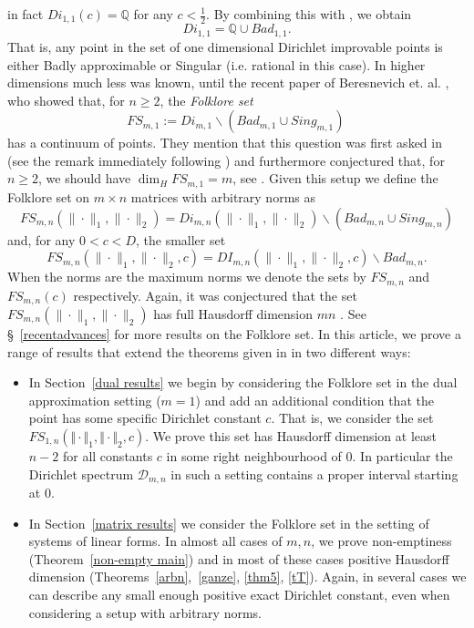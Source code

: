 \documentclass[10pt]{amsart}
\theoremstyle{definition}
\newcommand{\Q}{\mathbb{Q}}
\begin{document}
in fact $Di_{1,1}(c)=\Q$ for any $c<\frac{1}{2}$.
By combining this with \cite[Theorem 1]{DavenportSchmidt3},  we obtain
\begin{equation*}
    Di_{1,1}=\Q\cup Bad_{1,1}.
\end{equation*}
That is, any point in the set of one dimensional Dirichlet improvable points is either Badly approximable or Singular (i.e. rational in this case). In higher dimensions much less was known, until the recent paper of Beresnevich et. al. \cite{BerGuaMarRamVel}, who showed that, for $n\geq 2$, the \textit{Folklore set}
\begin{equation*}
    FS_{m,1}:=Di_{m,1}\backslash(Bad_{m,1}\cup Sing_{m,1})\, 
\end{equation*}
has a continuum of points. They mention that this question was first asked in \cite{FabianSuessThesis} (see the remark immediately following \cite[Theorem 4.6]{FabianSuessThesis}) and furthermore conjectured that, for $n\geq 2$, we should have $\dim_H FS_{m,1}=m$, see \cite[Problem 3.1]{BerGuaMarRamVel}. Given this setup we define the Folklore set on $m\times n$ matrices with arbitrary norms as
\begin{equation*}
    FS_{m,n}(\|\cdot\|_{1},\|\cdot\|_{2})=Di_{m,n}(\|\cdot\|_{1},\|\cdot\|_{2})\backslash \left(Bad_{m,n} \cup Sing_{m,n} \right)
\end{equation*}
and, for any $0<c<D$, the smaller set
\begin{equation*}
     FS_{m,n}(\|\cdot\|_{1},\|\cdot\|_{2},c)=DI_{m,n}(\|\cdot\|_{1},\|\cdot\|_{2},c)\backslash Bad_{m,n}.
\end{equation*}
When the norms are the maximum norms we denote the sets by $FS_{m,n}$ and $FS_{m,n}(c)$ respectively. Again, it was conjectured that the set $FS_{m,n}(\|\cdot\|_{1},\|\cdot\|_{2})$ has full Hausdorff dimension $mn$ \cite[Problem 4.1]{BerGuaMarRamVel}. See \S~\ref{recentadvances} for more results on the Folklore set. In this article, we prove a range of results that extend the theorems given in \cite{BerGuaMarRamVel} in two different ways:
\begin{itemize}
    \item In Section~\ref{dual results} we begin by considering the Folklore set in the dual approximation setting ($m=1$) and add an additional condition that the point has some specific Dirichlet constant $c$. That is, we consider the set $FS_{1,n}(\Vert\cdot\Vert_{1},\Vert\cdot\Vert_{2},c)$. We prove this set has Hausdorff dimension at least $n-2$ for all constants $c$ in some right neighbourhood of $0$. In particular the Dirichlet spectrum $\mathcal{D}_{m,n}$ in such a setting contains a proper interval
    starting at $0$.
    \item In Section~\ref{matrix results} we consider the Folklore set in the setting of systems of linear forms. In almost all cases of $m,n$, we prove non-emptiness (Theorem~\ref{non-empty main}) and in most of these cases positive Hausdorff dimension 
 {(Theorems~\ref{arbn},~\ref{ganze}, \ref{thm5}, \ref{tT}).} Again, in several cases we can describe any small enough positive exact Dirichlet constant, even when considering a setup with arbitrary norms.
\end{itemize}
\end{document}
